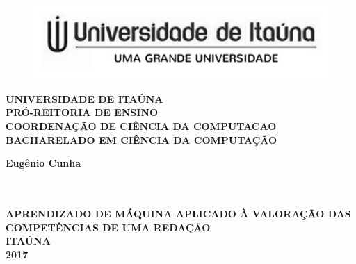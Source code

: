 \thispagestyle{empty}

\vfill
 \begin{center}
    \begin{figure}[t]
     \centering
            \includegraphics[width=15cm]{figuras/logo-uit.pdf}\\[-0.1in]
     \end{figure}

    {\large\bfseries UNIVERSIDADE DE ITAÚNA} \\
    {\large\bfseries PRÓ-REITORIA DE ENSINO} \\
    {\large\bfseries COORDENAÇÃO DE CIÊNCIA DA COMPUTACAO}  \\ 
    {\large\bfseries BACHARELADO EM CIÊNCIA DA COMPUTAÇÃO}  \\ 

    \vspace*{1in}
    \begin{large} \bfseries Eugênio Cunha\end{large}\\[0.4in]

    \vspace*{4cm}
    \noindent \\
    \large\bfseries{APRENDIZADO DE MÁQUINA APLICADO À VALORAÇÃO DAS COMPETÊNCIAS DE UMA REDAÇÃO} \\
    \vfill
    \large\bfseries{ ITAÚNA \\ 2017}
\end{center}

\normalsize